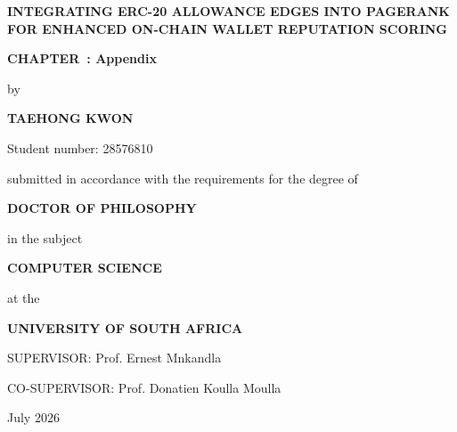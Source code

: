 \ifcase\ChapterOnly\relax
\or
  \def\ChapterCoverTitle{Introduction and Research Problem}%
\or
  \def\ChapterCoverTitle{Literature Review and Theoretical Framework}%
\or
  \def\ChapterCoverTitle{Research Methodology}%
\or
  \def\ChapterCoverTitle{Implementation and Empirical Results}%
\or
  \def\ChapterCoverTitle{Discussion}%
\or
  \def\ChapterCoverTitle{Conclusion and Future Work}%
\or
  \def\ChapterCoverTitle{References}%
\or
  \def\ChapterCoverTitle{Appendix}%
\fi

\begin{titlepage}
\centering
\vspace*{0.4cm}
{\Large\bfseries INTEGRATING ERC-20 ALLOWANCE EDGES INTO PAGERANK FOR ENHANCED ON-CHAIN WALLET REPUTATION SCORING\par}
\vspace{1.2cm}
{\large\bfseries CHAPTER~\ChapterOnly: \ChapterCoverTitle\par}
\vfill
{by\par}
\vspace{0.7cm}
{\large\bfseries TAEHONG KWON\par}
\vspace{0.35cm}
{Student number: 28576810\par}
\vfill
{submitted in accordance with the requirements for the degree of\par}
\vspace{0.7cm}
{\large\bfseries DOCTOR OF PHILOSOPHY\par}
\vspace{0.35cm}
{in the subject\par}
\vspace{0.7cm}
{\large\bfseries COMPUTER SCIENCE\par}
\vfill
{at the\par}
\vspace{0.7cm}
{\large\bfseries UNIVERSITY OF SOUTH AFRICA\par}
\vfill
{SUPERVISOR: Prof. Ernest Mnkandla\par}
\vspace{0.35cm}
{CO-SUPERVISOR: Prof. Donatien Koulla Moulla\par}
\vfill
{July 2026\par}
\end{titlepage}
\restoregeometry
\ifdefined\ChapterStartPage
  \setcounter{page}{\ChapterStartPage}%
\fi
